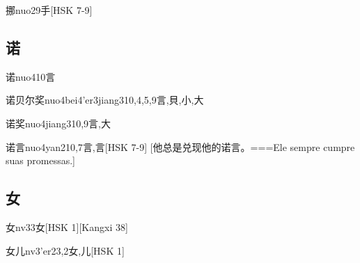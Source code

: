 \begin{EntryWithPhonetic}{挪}{nuo2}{9}{⼿}[HSK 7-9]
\end{EntryWithPhonetic}

\subsection*{诺}

\begin{EntryWithPhonetic}{诺}{nuo4}{10}{⾔}
\end{EntryWithPhonetic}

\begin{EntryWithPhonetic}{诺贝尔奖}{nuo4bei4'er3jiang3}{10,4,5,9}{⾔,⾙,⼩,⼤}
\end{EntryWithPhonetic}

\begin{EntryWithPhonetic}{诺奖}{nuo4jiang3}{10,9}{⾔,⼤}
\end{EntryWithPhonetic}

\begin{EntryWithPhonetic}{诺言}{nuo4yan2}{10,7}{⾔,⾔}[HSK 7-9]
  [他总是兑现他的诺言。===Ele sempre cumpre suas promessas.]
\end{EntryWithPhonetic}

\subsection*{女}

\begin{EntryWithPhonetic}{女}{nv3}{3}{⼥}[HSK 1][Kangxi 38]
\end{EntryWithPhonetic}

\begin{EntryWithPhonetic}{女儿}{nv3'er2}{3,2}{⼥,⼉}[HSK 1]
\end{EntryWithPhonetic}


